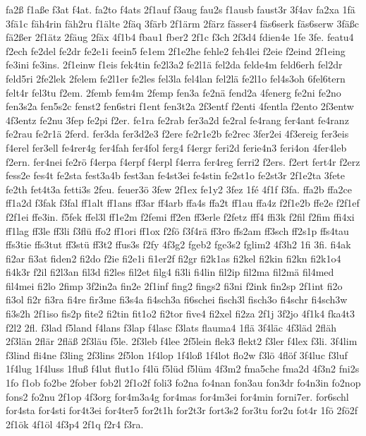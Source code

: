 {fa2ß
f1aße
f3at
f4at.
fa2to
f4ats
2f1auf
f3aug
fau2s
f1ausb
faust3r
3f4av
fa2xa
1fä
3fä1c
fäh4rin
fäh2ru
f1älte
2fäq
3färb
2f1ärm
2färz
fässer4
fäs6serk
fäs6serw
3fäßc
fä2ßer
2f1ätz
2fäug
2fäx
4f1b4
fbau1
fber2
2f1c
f3ch
2f3d4
fdien4e
1fe
3fe.
featu4
f2ech
fe2del
fe2dr
fe2e1i
feein5
fe1em
2f1e2he
fehle2
feh4lei
f2eie
f2eind
2f1eing
fe3ini
fe3ins.
2f1einw
f1eis
fek4tin
fe2l3a2
fe2l1ä
fel2da
felde4m
feld6erh
fel2dr
feld5ri
2fe2lek
2felem
fe2l1er
fe2les
fel3la
fel4lan
fel2lä
fe2l1o
fel4s3oh
6fel6tern
felt4r
fel3tu
f2em.
2femb
fem4m
2femp
fen3a
fe2nä
fend2a
4fenerg
fe2ni
fe2no
fen3s2a
fen5s2c
fenst2
fen6stri
f1ent
fen3t2a
2f3entf
f2enti
4fentla
f2ento
2f3entw
4f3entz
fe2nu
3fep
fe2pi
f2er.
fe1ra
fe2rab
fer3a2d
fe2ral
fe4rang
fer4ant
fe4ranz
fe2rau
fe2r1ä
2ferd.
fer3da
fer3d2e3
f2ere
fe2r1e2b
fe2rec
3fer2ei
4f3ereig
fer3eis
f4erel
fer3ell
fe4rer4g
fer4fah
fer4fol
ferg4
f4ergr
feri2d
ferie4n3
feri4on
4fer4leb
f2ern.
fer4nei
fe2rö
f4erpa
f4erpf
f4erpl
f4erra
fer4reg
ferri2
f2ers.
f2ert
fert4r
f2erz
fess2e
fes4t
fe2sta
fest3a4b
fest3an
fe4st3ei
fe4stin
fe2st1o
fe2st3r
2f1e2ta
3fete
fe2th
fet4t3a
fetti3s
2feu.
feuer3ö
3few
2f1ex
fe1y2
3fez
1fé
4f1f
f3fa.
ffa2b
ffa2ce
ff1a2d
f3fak
f3fal
ff1alt
ff1ans
ff3ar
ff4arb
ffa4s
ffa2t
ff1au
ffa4z
f2f1e2b
ffe2e
f2f1ef
f2f1ei
ffe3in.
f5fek
ffel3l
ff1e2m
f2femi
ff2en
ff3erle
f2fetz
fff4
ffi3k
f2fil
f2fim
ffi4xi
ff1lag
ff3le
ff3li
f3flü
ffo2
ff1ori
ff1ox
f2fö
f3f4rä
ff3ro
ffs2am
ff3sch
ff2s1p
ffs4tau
ffs3tie
ffs3tut
ff3stü
ff3t2
ffus3s
f2fy
4f3g2
fgeb2
fge3s2
fglim2
4f3h2
1fi
3fi.
fi4ak
fi2ar
fi3at
fiden2
fi2do
f2ie
fi2e1i
fi1er2f
fi2gr
fi2k1as
fi2kel
fi2kin
fi2kn
fi2k1o4
fi4k3r
f2il
fi2l3an
fil3d
fi2les
fil2et
filg4
fi3li
fi4lin
fil2ip
fil2ma
fil2mä
fil4med
fil4mei
fi2lo
2fimp
3f2in2a
fin2e
2f1inf
fing2
fings2
fi3ni
f2ink
fin2sp
2f1int
fi2o
fi3ol
fi2r
fi3ra
fi4re
fir3me
fi3s4a
fi4sch3a
fi6schei
fisch3l
fisch3o
fi4schr
fi4sch3w
fi3s2h
2f1iso
fis2p
fite2
fi2tin
fit1o2
fi2tor
five4
fi2xel
fi2za
2f1j
3f2jo
4f1k4
fka4t3
f2l2
2fl.
f3lad
f5land
f4lans
f3lap
f4lasc
f3lats
flauma4
1flä
3f4läc
4f3läd
2fläh
2f3län
2flär
2fläß
2f3läu
f5le.
2f3leb
f4lee
2f5lein
flek3
flekt2
f3ler
f4lex
f3li.
3f4lim
f3lind
fli4ne
f3ling
2f3lins
2f5lon
1f4lop
1f4loß
1f4lot
flo2w
f3lö
4flöf
3f4luc
f3luf
1f4lug
1f4luss
1fluß
f4lut
flut1o
f4lü
f5lüd
f5lüm
4f3m2
fma5che
fma2d
4f3n2
fni2s
1fo
f1ob
fo2be
2fober
fob2l
2f1o2f
foli3
fo2na
fo4nan
fon3au
fon3dr
fo4n3in
fo2nop
fons2
fo2nu
2f1op
4f3org
for4m3a4g
for4mas
for4m3ei
for4min
forni7er.
for6schl
for4sta
for4sti
for4t3ei
for4ter5
for2t1h
for2t3r
fort3s2
for3tu
for2u
fot4r
1fö
2fö2f
2f1ök
4f1öl
4f3p4
2f1q
f2r4
f3ra.
}
